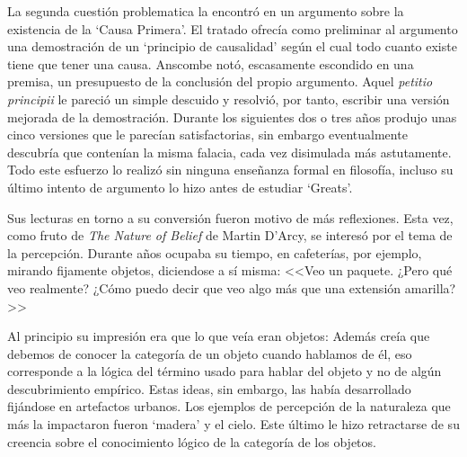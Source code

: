 La segunda cuestión problematica la encontró en un argumento sobre la existencia
de la `Causa Primera'. El tratado ofrecía como preliminar al argumento una
demostración de un `principio de causalidad' según el cual todo cuanto existe
tiene que tener una causa. Anscombe notó, escasamente escondido en una premisa,
un presupuesto de la conclusión del propio argumento. Aquel \emph{petitio
  principii} le pareció un simple descuido y resolvió, por tanto, escribir una
versión mejorada de la demostración. Durante los siguientes dos o tres años
produjo unas cinco versiones que le parecían satisfactorias, sin embargo
eventualmente descubría que contenían la misma falacia, cada vez disimulada más
astutamente. Todo este esfuerzo lo realizó sin ninguna enseñanza formal en
filosofía, incluso su último intento de argumento lo hizo antes de estudiar
`Greats'.\autocite[cf.~][p.~vii]{anscombe1981metaphysicsintro}


Sus lecturas en torno a su conversión fueron motivo de más reflexiones. Esta
vez, como fruto de \emph{The Nature of Belief} de Martin D'Arcy, se interesó por
el tema de la percepción. Durante años ocupaba su tiempo, en cafeterías, por
ejemplo, mirando fijamente objetos, diciendose a sí misma: <<Veo un paquete.
¿Pero qué veo realmente? ¿Cómo puedo decir que veo algo más que una extensión
amarilla?>>\autocite[cf.~][p.~viii]{anscombe1981metaphysicsintro}

Al principio su impresión era que lo que veía eran objetos:
\autocite[p.~viii]{anscombe1981metaphysicsintro} Además creía que
debemos de conocer la categoría de un objeto cuando hablamos de él, eso
corresponde a la lógica del término usado para hablar del objeto y no de algún
descubrimiento empírico. Estas ideas, sin embargo, las había desarrollado
fijándose en artefactos urbanos. Los ejemplos de percepción de la naturaleza que
más la impactaron fueron `madera' y el cielo. Este último le hizo retractarse de
su creencia sobre el conocimiento lógico de la categoría de los
objetos.\autocite[cf.~][p.~viii]{anscombe1981metaphysicsintro}


